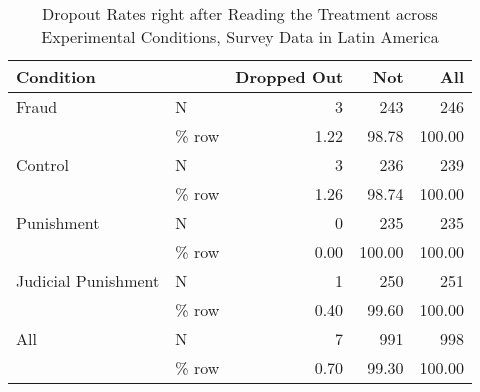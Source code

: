 \begin{table}

\caption{Dropout Rates right after Reading the Treatment across Experimental Conditions,
Survey Data in Latin America}
\centering
\begin{tabular}[t]{llrrr}
\toprule
Condition &   & Dropped Out & Not & All\\
\midrule
Fraud & N & 3 & 243 & 246\\
 & \% row & \num{1.22} & \num{98.78} & \num{100.00}\\
Control & N & 3 & 236 & 239\\
 & \% row & \num{1.26} & \num{98.74} & \num{100.00}\\
Punishment & N & 0 & 235 & 235\\
 & \% row & \num{0.00} & \num{100.00} & \num{100.00}\\
Judicial Punishment & N & 1 & 250 & 251\\
 & \% row & \num{0.40} & \num{99.60} & \num{100.00}\\
All & N & 7 & 991 & 998\\
 & \% row & \num{0.70} & \num{99.30} & \num{100.00}\\
\bottomrule
\end{tabular}
\end{table}
